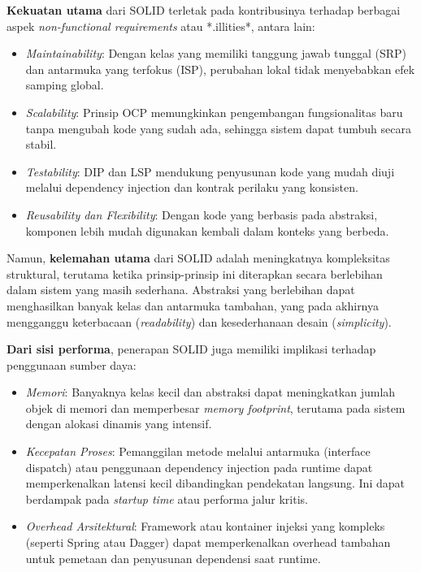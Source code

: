\textbf{Kekuatan utama} dari SOLID terletak pada kontribusinya terhadap berbagai aspek \textit{non-functional requirements} atau *.illities*, antara lain:
\begin{itemize}
	\item \textit{Maintainability}: Dengan kelas yang memiliki tanggung jawab tunggal (SRP) dan antarmuka yang terfokus (ISP), perubahan lokal tidak menyebabkan efek samping global.
	\item \textit{Scalability}: Prinsip OCP memungkinkan pengembangan fungsionalitas baru tanpa mengubah kode yang sudah ada, sehingga sistem dapat tumbuh secara stabil.
	\item \textit{Testability}: DIP dan LSP mendukung penyusunan kode yang mudah diuji melalui dependency injection dan kontrak perilaku yang konsisten.
	\item \textit{Reusability dan Flexibility}: Dengan kode yang berbasis pada abstraksi, komponen lebih mudah digunakan kembali dalam konteks yang berbeda.
\end{itemize}

Namun, \textbf{kelemahan utama} dari SOLID adalah meningkatnya kompleksitas struktural, terutama ketika prinsip-prinsip ini diterapkan secara berlebihan dalam sistem yang masih sederhana. Abstraksi yang berlebihan dapat menghasilkan banyak kelas dan antarmuka tambahan, yang pada akhirnya mengganggu keterbacaan (\textit{readability}) dan kesederhanaan desain (\textit{simplicity}).

\textbf{Dari sisi performa}, penerapan SOLID juga memiliki implikasi terhadap penggunaan sumber daya:
\begin{itemize}
	\item \textit{Memori}: Banyaknya kelas kecil dan abstraksi dapat meningkatkan jumlah objek di memori dan memperbesar \textit{memory footprint}, terutama pada sistem dengan alokasi dinamis yang intensif.
	\item \textit{Kecepatan Proses}: Pemanggilan metode melalui antarmuka (interface dispatch) atau penggunaan dependency injection pada runtime dapat memperkenalkan latensi kecil dibandingkan pendekatan langsung. Ini dapat berdampak pada \textit{startup time} atau performa jalur kritis.
	\item \textit{Overhead Arsitektural}: Framework atau kontainer injeksi yang kompleks (seperti Spring atau Dagger) dapat memperkenalkan overhead tambahan untuk pemetaan dan penyusunan dependensi saat runtime.
\end{itemize}

